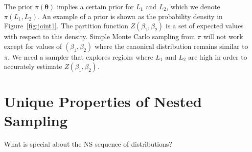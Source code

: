 \documentclass[entropy,article,submit,moreauthors,pdftex,10pt,a4paper]{Definitions/mdpi}
\newcommand{\xx}{\boldsymbol{\theta}}
\begin{document}
The prior $\pi(\xx)$ implies a certain prior for $L_1$ and $L_2$, which we
denote $\pi(L_1, L_2)$. An example of a prior is shown as the
probability density in Figure~\ref{fig:joint1}. The partition function
$Z(\beta_1, \beta_2)$ is a set of expected values with respect to this density.
Simple Monte Carlo sampling from $\pi$ will not work except for values of
$(\beta_1, \beta_2)$ where the canonical distribution remains similar to $\pi$.
We need a sampler that explores regions where $L_1$ and $L_2$ are high in order
to accurately estimate $Z(\beta_1, \beta_2)$.



\section{Unique Properties of Nested Sampling}
What is special about the NS sequence of distributions? 
\end{document}
